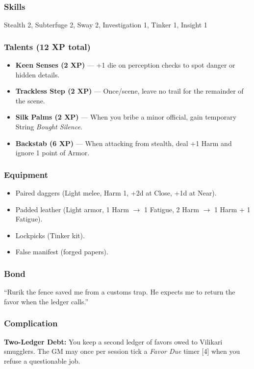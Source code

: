 \subsubsection*{Skills}
Stealth 2, Subterfuge 2, Sway 2, Investigation 1, Tinker 1, Insight 1

\subsubsection*{Talents (12 XP total)}
\begin{itemize}
  \item \textbf{Keen Senses (2 XP)} --- +1 die on perception checks to spot danger or hidden details.
  \item \textbf{Trackless Step (2 XP)} --- Once/scene, leave no trail for the remainder of the scene.
  \item \textbf{Silk Palms (2 XP)} --- When you bribe a minor official, gain temporary String \textit{Bought Silence}.
  \item \textbf{Backstab (6 XP)} --- When attacking from stealth, deal +1 Harm and ignore 1 point of Armor.
\end{itemize}

\subsubsection*{Equipment}
\begin{itemize}
  \item Paired daggers (Light melee, Harm 1, +2d at Close, +1d at Near).
  \item Padded leather (Light armor, 1 Harm $\rightarrow$ 1 Fatigue, 2 Harm $\rightarrow$ 1 Harm + 1 Fatigue).
  \item Lockpicks (Tinker kit).
  \item False manifest (forged papers).
\end{itemize}

\subsubsection*{Bond}
``Rurik the fence saved me from a customs trap. He expects me to return the favor when the ledger calls.''

\subsubsection*{Complication}
\textbf{Two-Ledger Debt:} You keep a second ledger of favors owed to Vilikari smugglers. The GM may once per session tick a \textit{Favor Due} timer [4] when you refuse a questionable job.

